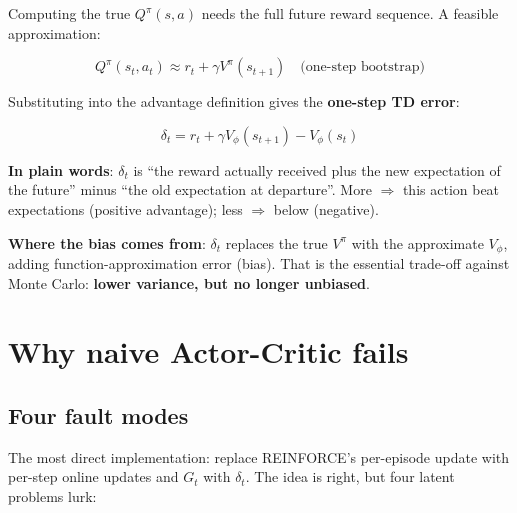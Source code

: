 \documentclass{article}
\begin{document}
Computing the true $Q^\pi(s,a)$ needs the full future reward sequence. A feasible approximation:

\[
Q^\pi(s_t, a_t) \approx r_t + \gamma V^\pi(s_{t+1}) \quad \text{(one-step bootstrap)}
\]

Substituting into the advantage definition gives the \textbf{one-step TD error}:

\[
\boxed{\delta_t = r_t + \gamma V_\phi(s_{t+1}) - V_\phi(s_t)}
\]

\textbf{In plain words}: $\delta_t$ is ``the reward actually received plus the new expectation of the future'' minus ``the old expectation at departure''. More $\Rightarrow$ this action beat expectations (positive advantage); less $\Rightarrow$ below (negative).

\textbf{Where the bias comes from}: $\delta_t$ replaces the true $V^\pi$ with the approximate $V_\phi$, adding function-approximation error (bias). That is the essential trade-off against Monte Carlo: \textbf{lower variance, but no longer unbiased}.

\section*{Why naive Actor-Critic fails}

\subsection*{Four fault modes}

The most direct implementation: replace REINFORCE's per-episode update with per-step online updates and $G_t$ with $\delta_t$. The idea is right, but four latent problems lurk:
\end{document}
